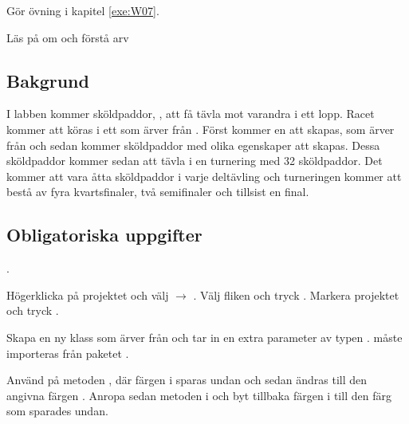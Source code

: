 

\Teamlab{\LabWeekSEVEN}

\begin{Goals}

\end{Goals}

\begin{Preparations}
\item Gör övning {\tt \ExeWeekSEVEN} i kapitel \ref{exe:W07}.
\item Läs på om och förstå arv

\end{Preparations}

\subsection{Bakgrund}
I labben kommer sköldpaddor, , att få tävla mot varandra i ett lopp. Racet kommer att köras i ett  som ärver från . Först kommer en  att skapas, som ärver från  och sedan kommer sköldpaddor med olika egenskaper att skapas. Dessa sköldpaddor kommer sedan att tävla i en turnering med 32 sköldpaddor. Det kommer att vara åtta sköldpaddor i varje deltävling och turneringen kommer att bestå av fyra kvartsfinaler, två semifinaler och tillsist en final.

\subsection{Obligatoriska uppgifter}

\Task {}.

\Subtask Högerklicka på projektet  och välj  $\rightarrow$ . Välj fliken  och tryck . Markera projektet  och tryck .

\Subtask Skapa en ny klass  som ärver från  och tar in en extra parameter  av typen .  måste importeras från paketet .

\Subtask Använd  på metoden , där färgen i  sparas undan och sedan ändras till den angivna färgen . Anropa sedan metoden  i  och byt tillbaka färgen i  till den färg som sparades undan.

